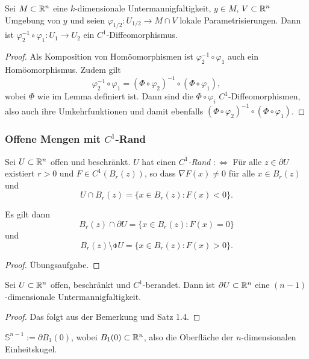 \begin{thm}
 Sei $M \subset \mathbb{R}^n$ eine $k$-dimensionale Untermannigfaltigkeit, $y \in M$, $V \subset \mathbb{R}^n$ Umgebung von $y$ und seien $\varphi_{1/2}: U_{1/2} \to M \cap V$ lokale Parametrisierungen. Dann ist $\varphi_2^{-1} \circ \varphi_1 : U_1 \to U_2$ ein $C^1$-Diffeomorphismus.
\end{thm}

\begin{proof}
 Als Komposition von Homöomorphismen ist $\varphi_2^{-1} \circ \varphi_1$ auch ein Homöo\-morphis\-mus. Zudem gilt
 \[ \varphi_2^{-1} \circ \varphi_1 = (\Phi \circ \varphi_2)^{-1} \circ (\Phi \circ \varphi_1), \]
 wobei $\Phi$ wie im Lemma definiert ist. Dann sind die $\Phi \circ \varphi_i$ $C^1$-Diffeomorphismen, also auch ihre Umkehrfunktionen und damit ebenfalls $(\Phi \circ \varphi_2)^{-1} \circ (\Phi \circ \varphi_1)$.
\end{proof}

\subsubsection{Offene Mengen mit \texorpdfstring{$C^1$}{C1}-Rand}\label{sect:offen}
Sei $U \subset \mathbb{R}^n$ offen und beschränkt. $U$ hat einen \emph{$C^1$-Rand} $:\Leftrightarrow$ Für alle $z \in \partial U$ existiert $r > 0$ und $F \in C^1( B_r(z) )$, so dass $\nabla F(x) \ne 0$ für alle $x \in B_r(z)$ und
\[ U \cap B_r(z) = \{ x \in B_r(z) : F(x) < 0 \}. \]

\begin{rmrk}
 Es gilt dann
 \[ B_r(z) \cap \partial U = \{ x \in B_r(z) : F(x) = 0 \} \]
 und
 \[ B_r(z) \setminus \obar{U} = \{ x \in B_r(z) : F(x) > 0 \}. \]
\end{rmrk}

\begin{proof}
 Übungsaufgabe.
\end{proof}

\begin{thm}
 Sei $U \subset \mathbb{R}^n$ offen, beschränkt und $C^1$-berandet. Dann ist $\partial U \subset \mathbb{R}^n$ eine $(n-1)$-dimensionale Untermannigfaltigkeit.
\end{thm}

\begin{proof}
  Das folgt aus der Bemerkung und Satz 1.4.
\end{proof}

$\mathbb{S}^{n-1} := \partial B_1(0)$, wobei $B_1(0) \subset \mathbb{R}^n$, also die Oberfläche der $n$-dimensionalen Einheitskugel.

